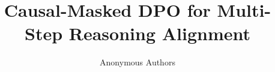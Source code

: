 \documentclass{article}
\title{Causal-Masked DPO for Multi-Step Reasoning Alignment}
\author{Anonymous Authors}
\begin{document}
\maketitle

\begin{abstract}

\end{abstract}











\end{document}
